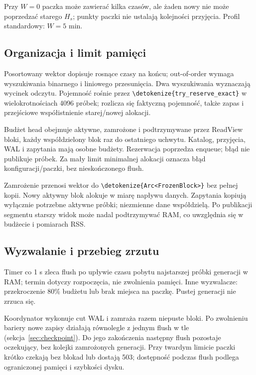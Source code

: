 \documentclass[11pt,a4paper]{article}
\newcommand{\code}[1]{\expandafter\nolinkurl\expandafter{\detokenize{#1}}}
\begin{document}
Przy $W=0$ paczka może zawierać kilka czasów, ale żaden nowy nie może
poprzedzać starego $H_s$; punkty paczki nie ustalają kolejności przyjęcia.
Profil standardowy: $W=5$ min.

\subsection{Organizacja i limit pamięci}
Posortowany wektor dopisuje rosnące czasy na końcu; out-of-order wymaga
wyszukiwania binarnego i liniowego przesunięcia. Dwa wyszukiwania
wyznaczają wycinek odczytu. Pojemność rośnie przez
\code{try_reserve_exact} w wielokrotnościach 4096 próbek;
rozlicza się faktyczną pojemność, także zapas i przejściowe
współistnienie starej/nowej alokacji.

Budżet head obejmuje aktywne, zamrożone i podtrzymywane przez ReadView
bloki, każdy współdzielony blok raz do ostatniego uchwytu.
Katalog, przyjęcia, WAL i zapytania mają osobne budżety.
Rezerwacja poprzedza enqueue; błąd nie publikuje próbek.
Za mały limit minimalnej alokacji oznacza błąd konfiguracji/paczki,
bez nieskończonego flush.

Zamrożenie przenosi wektor do \code{Arc<FrozenBlock>} bez pełnej kopii.
Nowy aktywny blok alokuje w miarę napływu danych. Zapytania kopiują
wyłącznie potrzebne aktywne próbki; niezmienne dane współdzielą.
Po publikacji segmentu starszy widok może nadal podtrzymywać RAM,
co uwzględnia się w budżecie i pomiarach RSS.

\subsection{Wyzwalanie i przebieg zrzutu}
Timer co 1 s zleca flush po upływie czasu pobytu najstarszej próbki
generacji w RAM; termin dotyczy rozpoczęcia, nie zwolnienia pamięci.
Inne wyzwalacze: przekroczenie 80\% budżetu lub brak miejsca na paczkę.
Pustej generacji nie zrzuca się.

Koordynator wykonuje cut WAL i zamraża razem niepuste bloki.
Po zwolnieniu bariery nowe zapisy działają równolegle z jednym flush
w tle (sekcja~\ref{sec:checkpoint}). Do jego zakończenia następny flush
pozostaje oczekujący, bez kolejki zamrożonych generacji.
Przy twardym limicie paczki krótko czekają bez blokad lub dostają 503;
dostępność podczas flush podlega ograniczonej pamięci i szybkości dysku.
\end{document}
